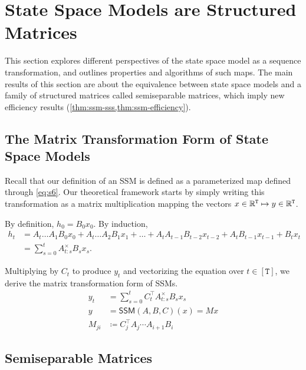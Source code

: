 \section{State Space Models are Structured Matrices}
\label{sec:ssm}


This section explores different perspectives of the state space model as a sequence transformation, and outlines properties and algorithms of such maps.
The main results of this section are about the equivalence between state space models and a family of structured matrices called semiseparable matrices,
which imply new efficiency results (\cref{thm:ssm-sss,thm:ssm-efficiency}).

\subsection{The Matrix Transformation Form of State Space Models}

Recall that our definition of an SSM is defined as a parameterized map
defined through \eqref{eq:s6}.
Our theoretical framework starts by simply writing this transformation as a matrix multiplication mapping the vectors $x \in \mathbb{R}^\mathtt{T} \mapsto y \in \mathbb{R}^\mathtt{T}$.

By definition, $h_0 = B_0 x_0$.
By induction,
\begin{align*}
  h_t &= A_t \dots A_1 B_0 x_0 + A_t \dots A_2 B_1 x_1 + \dots + A_t A_{t-1} B_{t-2} x_{t-2} + A_t B_{t-1} x_{t-1} + B_t x_t
    \\&= \sum_{s=0}^t A_{t:s}^\times B_s x_s
    .
\end{align*}

Multiplying by $C_t$ to produce $y_t$ and vectorizing the equation over $t \in [\mathtt{T}]$,
we derive the matrix transformation form of SSMs.
\begin{equation}
  \label{eq:ssm-matrix}
  \begin{aligned}
    y_t &= \sum_{s=0}^t C_t^{\top} A_{t:s}^\times B_s x_s
    \\
    y &= \mathsf{SSM}(A, B, C)(x) = Mx
    \\
    M_{ji} &\coloneqq C_j^{\top} A_{j} \cdots A_{i+1} B_{i}
  \end{aligned}
\end{equation}

\subsection{Semiseparable Matrices}

